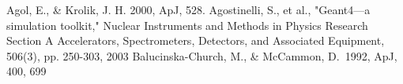 \clearpage
{} %
\renewcommand{\bibsection}{\centerline{\textbf{BIBLIOGRAPHY}}}
\begin{thebibliography}{}
\vspace{12pt}\singlespace

Agol, E., \& Krolik, J. H. 2000, ApJ, 528.
Agostinelli, S., et al., "Geant4---a simulation toolkit," Nuclear Instruments and Methods in Physics Research Section A\: Accelerators, Spectrometers, Detectors, and Associated Equipment, 506(3), pp. 250-303, 2003
 Balucinska-Church, M., \& McCammon, D.\ 1992, ApJ, 400, 699

\end{thebibliography}
